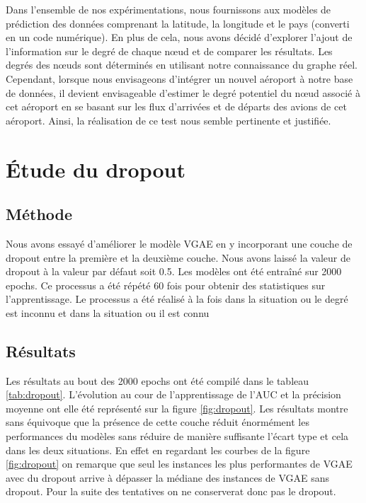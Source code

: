 \documentclass{article}
\begin{document}
Dans l'ensemble de nos expérimentations, nous fournissons aux modèles de prédiction des données comprenant la latitude, la longitude et le pays (converti en un code numérique). En plus de cela, nous avons décidé d'explorer l'ajout de l'information sur le degré de chaque nœud et de comparer les résultats.
Les degrés des nœuds sont déterminés en utilisant notre connaissance du graphe réel. Cependant, lorsque nous envisageons d'intégrer un nouvel aéroport à notre base de données, il devient envisageable d'estimer le degré potentiel du nœud associé à cet aéroport en se basant sur les flux d'arrivées et de départs des avions de cet aéroport. Ainsi, la réalisation de ce test nous semble pertinente et justifiée.


\section{Étude du dropout}
\label{sec:dropout}
\subsection{Méthode}
Nous avons essayé d'améliorer le modèle VGAE en y incorporant une couche de dropout entre la première et la deuxième couche. 
Nous avons laissé la valeur de dropout à la valeur par défaut soit 0.5. 
Les modèles ont été entraîné sur 2000 epochs. 
Ce processus a été répété 60 fois pour obtenir des statistiques sur l'apprentissage.
Le processus a été réalisé à la fois dans la situation ou le degré est inconnu et dans la situation ou il est connu

\subsection{Résultats}
Les résultats au bout des 2000 epochs ont été compilé dans le tableau \ref{tab:dropout}.
L'évolution au cour de l'apprentissage de l'AUC et la précision moyenne ont elle été représenté sur la figure \ref{fig:dropout}.
Les résultats montre sans équivoque que la présence de cette couche réduit énormément les performances du modèles sans réduire de manière suffisante l'écart type et cela dans les deux situations.
En effet en regardant les courbes de la figure \ref{fig:dropout} on remarque que seul les instances les plus performantes de VGAE avec du dropout arrive à dépasser la médiane des instances de VGAE sans dropout.
Pour la suite des tentatives on ne conserverat donc pas le dropout.
\end{document}
